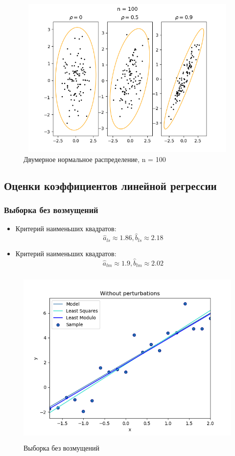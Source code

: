 \documentclass[../body.tex]{subfiles}
\begin{document}
	\begin{figure}[H]
		\centering
		\includegraphics[width = 12cm, height = 8cm]{img/Ellipse n = 100.png}
		\caption{Двумерное нормальное распределение, n = 100}
		\label{fig:f100}
	\end{figure}
	
	\subsection{Оценки коэффициентов линейной регрессии}
	\subsubsection{Выборка без возмущений}
	\begin{itemize}
		\item Критерий наименьших квадратов: $$\hat{a}_{ls} \approx 1.86, \hat{b}_{ls} \approx 2.18$$
		\item Критерий наименьших квадратов: $$\hat{a}_{lm} \approx 1.9, \hat{b}_{lm} \approx 2.02$$
	\end{itemize}
	
	\begin{figure}[H]
		\centering
		\includegraphics[width = 12cm, height = 9cm]{img/Without perturbations.png}
		\caption{Выборка без возмущений}
		\label{without}
	\end{figure}
	
\end{document}
